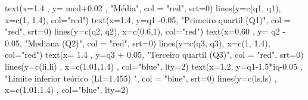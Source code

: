 \documentclass[
]{book}
\newenvironment{Shaded}{\begin{snugshade}}{\end{snugshade}}
\newcommand{\AttributeTok}[1]{\textcolor[rgb]{0.77,0.63,0.00}{#1}}
\newcommand{\DecValTok}[1]{\textcolor[rgb]{0.00,0.00,0.81}{#1}}
\newcommand{\FloatTok}[1]{\textcolor[rgb]{0.00,0.00,0.81}{#1}}
\newcommand{\FunctionTok}[1]{\textcolor[rgb]{0.00,0.00,0.00}{#1}}
\newcommand{\NormalTok}[1]{#1}
\newcommand{\SpecialCharTok}[1]{\textcolor[rgb]{0.00,0.00,0.00}{#1}}
\newcommand{\StringTok}[1]{\textcolor[rgb]{0.31,0.60,0.02}{#1}}
\begin{document}
\begin{Shaded}
\begin{Highlighting}[]
\FunctionTok{text}\NormalTok{(}\AttributeTok{x=}\FloatTok{1.4}\NormalTok{ , }\AttributeTok{y=}\NormalTok{ med}\FloatTok{+0.02}\NormalTok{ , }\StringTok{"Média"}\NormalTok{, }\AttributeTok{col =} \StringTok{"red"}\NormalTok{, }\AttributeTok{srt=}\DecValTok{0}\NormalTok{)}
\FunctionTok{lines}\NormalTok{(}\AttributeTok{y=}\FunctionTok{c}\NormalTok{(q1, q1), }\AttributeTok{x=}\FunctionTok{c}\NormalTok{(}\DecValTok{1}\NormalTok{, }\FloatTok{1.4}\NormalTok{), }\AttributeTok{col=}\StringTok{"red"}\NormalTok{) }
\FunctionTok{text}\NormalTok{(}\AttributeTok{x=}\FloatTok{1.4}\NormalTok{, }\AttributeTok{y=}\NormalTok{q1 }\SpecialCharTok{{-}}\FloatTok{0.05}\NormalTok{, }\StringTok{"Primeiro quartil (Q1)"}\NormalTok{, }\AttributeTok{col =} \StringTok{"red"}\NormalTok{, }\AttributeTok{srt=}\DecValTok{0}\NormalTok{)}
\FunctionTok{lines}\NormalTok{(}\AttributeTok{y=}\FunctionTok{c}\NormalTok{(q2, q2),  }\AttributeTok{x=}\FunctionTok{c}\NormalTok{(}\FloatTok{0.6}\NormalTok{,}\DecValTok{1}\NormalTok{), }\AttributeTok{col=}\StringTok{"red"}\NormalTok{) }
\FunctionTok{text}\NormalTok{(}\AttributeTok{x=}\FloatTok{0.60}\NormalTok{ , }\AttributeTok{y=}\NormalTok{ q2 }\SpecialCharTok{{-}} \FloatTok{0.05}\NormalTok{, }\StringTok{"Mediana (Q2)"}\NormalTok{, }\AttributeTok{col =} \StringTok{"red"}\NormalTok{, }\AttributeTok{srt=}\DecValTok{0}\NormalTok{)}
\FunctionTok{lines}\NormalTok{(}\AttributeTok{y=}\FunctionTok{c}\NormalTok{(q3, q3), }\AttributeTok{x=}\FunctionTok{c}\NormalTok{(}\DecValTok{1}\NormalTok{, }\FloatTok{1.4}\NormalTok{), }\AttributeTok{col=}\StringTok{"red"}\NormalTok{) }
\FunctionTok{text}\NormalTok{(}\AttributeTok{x=} \FloatTok{1.4}\NormalTok{ , }\AttributeTok{y=}\NormalTok{q3 }\SpecialCharTok{+} \FloatTok{0.05}\NormalTok{, }\StringTok{"Terceiro quartil (Q3)"}\NormalTok{, }\AttributeTok{col =} \StringTok{"red"}\NormalTok{, }\AttributeTok{srt=}\DecValTok{0}\NormalTok{)}
\FunctionTok{lines}\NormalTok{(}\AttributeTok{y=}\FunctionTok{c}\NormalTok{(li,li) , }\AttributeTok{x=}\FunctionTok{c}\NormalTok{(}\FloatTok{1.01}\NormalTok{,}\FloatTok{1.4}\NormalTok{) , }\AttributeTok{col=}\StringTok{"blue"}\NormalTok{, }\AttributeTok{lty=}\DecValTok{2}\NormalTok{) }
\FunctionTok{text}\NormalTok{(}\AttributeTok{x=}\FloatTok{1.2}\NormalTok{, }\AttributeTok{y=}\NormalTok{q1}\FloatTok{{-}1.5}\SpecialCharTok{*}\NormalTok{iq}\FloatTok{{-}0.05}\NormalTok{ , }\StringTok{"Limite inferior teórico (LI=1,455) "}\NormalTok{, }\AttributeTok{col =} \StringTok{"blue"}\NormalTok{, }\AttributeTok{srt=}\DecValTok{0}\NormalTok{)}
\FunctionTok{lines}\NormalTok{(}\AttributeTok{y=}\FunctionTok{c}\NormalTok{(ls,ls) , }\AttributeTok{x=}\FunctionTok{c}\NormalTok{(}\FloatTok{1.01}\NormalTok{,}\FloatTok{1.4}\NormalTok{) , }\AttributeTok{col=}\StringTok{"blue"}\NormalTok{, }\AttributeTok{lty=}\DecValTok{2}\NormalTok{) }

\end{Highlighting}
\end{Shaded}
\end{document}
